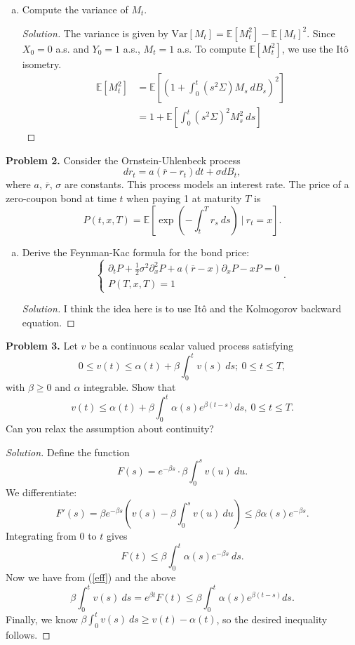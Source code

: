 \documentclass[11pt,letterpaper]{report}
\newcommand{\E}{\mathbb{E}}
\newcommand{\Var}{\text{Var}}
\newenvironment{solution}
{\begin{proof}[Solution]}
{\end{proof}}
\begin{document}
\begin{enumerate}[(a)]
	\item Compute the variance of $M_t$.
	\begin{solution}
		The variance is given by $\Var[M_t] = \E[M_t^2] - \E[M_t]^2$. Since $X_0 = 0$ a.s. and $Y_0 = 1$ a.s., $M_t = 1$ a.s. To compute $\E[M_t^2]$, we use the It\^o isometry.
		\begin{align*}
			\E[M_t^2] &= \E\left[ \left(1 + \int_0^t(s^2\Sigma)M_s\ dB_s  \right)^2 \right]\\
			&= 1 + \E\left[\int_0^t (s^2\Sigma)^2M_s^2\ ds \right]
		\end{align*}
	\end{solution}
\end{enumerate}

\noindent\textbf{Problem 2. }
Consider the Ornstein-Uhlenbeck process
\begin{equation}\label{O-U}
	dr_t = a(\overline{r}-r_t)dt + \sigma dB_t,
\end{equation}
where $a$, $\overline{r}$, $\sigma$ are constants. This process models an interest rate. The price of a zero-coupon bond at time $t$ when paying 1 at maturity $T$ is
\[
P(t, x, T) = \E\left[\exp\left(-\int_t^Tr_s\ ds\right)\ |\ r_t = x \right].
\]
\begin{enumerate}[(a)]
	\item Derive the Feynman-Kac formula for the bond price:
	\begin{equation}\label{F-K}
		\begin{cases}
			\partial_tP + \frac{1}{2}\sigma^2\partial_x^2P + a(\overline{r}-x)\partial_xP-xP = 0\\
			P(T, x, T) = 1
		\end{cases}.
	\end{equation}
	\begin{solution}
		I think the idea here is to use It\^o and the Kolmogorov backward equation.
	\end{solution}
\end{enumerate}


\noindent\textbf{Problem 3. }
Let $v$ be a continuous scalar valued process satisfying
\[
0\leq v(t)\leq \alpha(t)+\beta\int_0^tv(s)\ ds;\ 0\leq t\leq T,
\]
with $\beta\geq 0$ and $\alpha$ integrable. Show that
\[
v(t)\leq \alpha(t)+\beta\int_0^t\alpha(s)e^{\beta(t-s)}ds,\ 0\leq t\leq T.
\]
Can you relax the assumption about continuity?
\begin{solution}
	Define the function
	\begin{equation}\label{eff}
	F(s) = e^{-\beta s}\cdot \beta\int_0^sv(u)\ du.
	\end{equation}
	We differentiate:
	\[
	F'(s) = \beta e^{-\beta s}\left(v(s)-\beta\int_0^sv(u)\ du\right) \leq \beta\alpha(s)e^{-\beta s}.
	\]
	Integrating from 0 to $t$ gives
	\[
	F(t) \leq \beta\int_0^t\alpha(s)e^{-\beta s}\ ds.
	\]
	Now we have from (\ref{eff}) and the above 
	\[
	\beta \int_0^tv(s)\ ds = e^{\beta t}F(t)\leq \beta\int_0^t\alpha(s)e^{\beta(t-s)}ds.
	\]
	Finally, we know $\beta\int_0^tv(s)\ ds \geq v(t)-\alpha(t)$, so the desired inequality follows.
\end{solution}
\end{document}
